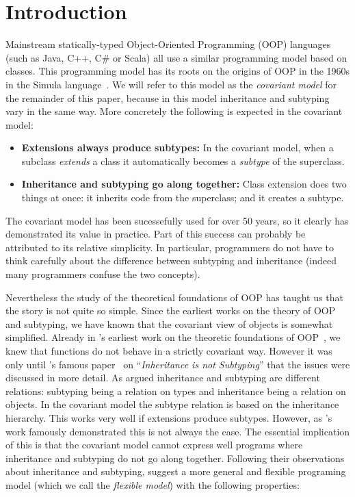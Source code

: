 \section{Introduction}
\label{sec:intro}

Mainstream statically-typed Object-Oriented Programming (OOP) languages (such as Java,
C++, C\# or Scala) all use a similar programming model based on
classes. This programming model has its roots on the
origins of OOP in the 1960s in the Simula language~\citep{dahl1967simula}.
We will refer to this model as the \emph{covariant model} for the
remainder of this paper, because in this model inheritance and
subtyping vary in the same way. More concretely
the following is expected in the covariant model:

\begin{itemize}

\item {\bf Extensions always produce subtypes:} In the covariant model, when a 
subclass \emph{extends} a class it automatically becomes a 
\emph{subtype} of the superclass.

\item{\bf Inheritance and subtyping go along together:}
Class extension does two things at once: it inherits code from the
superclass; and it creates a subtype. 

\end{itemize}

The covariant model has been sucessefully used for over 50 years,
so it clearly has demonstrated its value in practice. 
Part of this success can probably be attributed 
to its relative simplicity. In particular, programmers do not have to think carefully 
about the difference between subtyping and inheritance (indeed many
programmers confuse the two concepts). 

Nevertheless the study of the theoretical foundations of OOP has taught us that
the story is not quite so simple. Since the earliest works on the theory of OOP
and subtyping, we have known that the covariant view of objects is somewhat
simplified. Already in \citeauthor{cardelli1984semantics}'s earliest work on
the theoretic foundations of OOP~\citep{cardelli1984semantics}, we knew that functions do not behave in a
strictly covariant way. However it was only until \citeauthor{cook1989inheritance}'s
famous paper~\citeyear{cook1989inheritance} on ``\emph{Inheritance is not Subtyping}'' that the issues were
discussed in more detail. As \citeauthor{cook1989inheritance} argued inheritance and subtyping are
different relations: subtyping being a relation on types and inheritance being a
relation on objects. In the covariant model the subtype relation is based on the
inheritance hierarchy. This works very well if extensions produce subtypes.
However, as \citeauthor{cook1989inheritance}'s work famously demonstrated this is not always the
case. The essential implication of this is that the covariant model cannot
express well programs where inheritance and subtyping do not go along together.
Following their observations about inheritance and subtyping, \citeauthor{cook1989inheritance}
suggest a more general and flexible programing model (which we call the
\emph{flexible model}) with the following properties:

